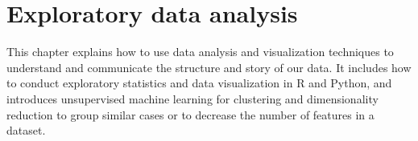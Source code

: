\chapter{Exploratory data analysis}

This chapter explains how to use data analysis and visualization techniques to understand and communicate the structure and story of our data.  It includes how to conduct exploratory statistics and data visualization in R and Python, and introduces unsupervised machine learning for clustering and dimensionality reduction to group similar cases or to decrease the number of features in a dataset.







